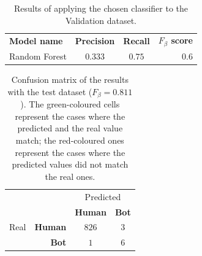 \documentclass[a4paper, 12pt]{book}
\begin{document}
\begin{table}[tb]
\renewcommand{\arraystretch}{1.5}
\begin{center}
\begin{tabular}{ l c c r }
  \toprule
  \textbf{Model name}    &  \textbf{Precision}  & \textbf{Recall}   &    \textbf{$F_{\beta}$ score} \\
      Random Forest   & $0.333$  &  $0.75$  &  $0.6$  \\  
  \bottomrule
\end{tabular}
\caption{Results of applying the chosen classifier to the Validation dataset.}
\label{table:model-results-val}
\end{center}
\end{table}

\begin{table}[tb]
\renewcommand{\arraystretch}{1.5}
\begin{center}
\begin{tabular}{ l r c c }
\toprule
      &                & \multicolumn{2}{c}{Predicted} \tabularnewline
      &                & \textbf{Human}              & \textbf{Bot} \\
                         
 Real & \textbf{Human} & \cellcolor[HTML]{67FD9A} $826$ & \cellcolor[HTML]{FD6864} $3$ \\ %
      & \textbf{Bot}   & \cellcolor[HTML]{FD6864} $1$   & \cellcolor[HTML]{67FD9A} $6$  \\ %
\bottomrule
\end{tabular}
\caption{Confusion matrix of the results with the test dataset ($F_{\beta} = 0.811$). The green-coloured cells represent the cases where the predicted and the real value match; the red-coloured ones represent the cases where the predicted values did not match the real ones.}
\label{table:confusion-matrix-test}
\end{center}
\end{table}
\end{document}
